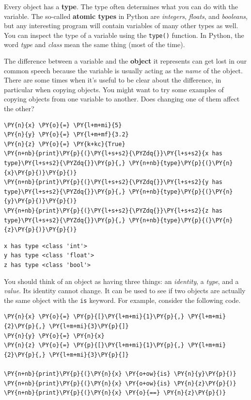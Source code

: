 Every object has a \textbf{type}.  The type often determines what you can do with the variable.  The so-called \textbf{atomic types} in Python are \emph{integers}, \emph{floats}, and \emph{booleans}, but any interesting program will contain variables of many other types as well.  You can inspect the type of a variable using the \texttt{type()} function.  In Python, the word \emph{type} and \emph{class} mean the same thing (most of the time).


The difference between a variable and the \textbf{object} it represents can get lost in our common speech because the variable is usually acting as the \emph{name} of the object.  There are some times when it's useful to be clear about the difference, in particular when copying objects.  You might want to try some examples of copying objects from one variable to another.  Does changing one of them affect the other?


\begin{Verbatim}[commandchars=\\\{\}]
\PY{n}{x} \PY{o}{=} \PY{l+m+mi}{5}
\PY{n}{y} \PY{o}{=} \PY{l+m+mf}{3.2}
\PY{n}{z} \PY{o}{=} \PY{k+kc}{True}
\PY{n+nb}{print}\PY{p}{(}\PY{l+s+s2}{\PYZdq{}}\PY{l+s+s2}{x has type}\PY{l+s+s2}{\PYZdq{}}\PY{p}{,} \PY{n+nb}{type}\PY{p}{(}\PY{n}{x}\PY{p}{)}\PY{p}{)}
\PY{n+nb}{print}\PY{p}{(}\PY{l+s+s2}{\PYZdq{}}\PY{l+s+s2}{y has type}\PY{l+s+s2}{\PYZdq{}}\PY{p}{,} \PY{n+nb}{type}\PY{p}{(}\PY{n}{y}\PY{p}{)}\PY{p}{)}
\PY{n+nb}{print}\PY{p}{(}\PY{l+s+s2}{\PYZdq{}}\PY{l+s+s2}{z has type}\PY{l+s+s2}{\PYZdq{}}\PY{p}{,} \PY{n+nb}{type}\PY{p}{(}\PY{n}{z}\PY{p}{)}\PY{p}{)}
\end{Verbatim}

\begin{Verbatim}
x has type <class 'int'>
y has type <class 'float'>
z has type <class 'bool'>
\end{Verbatim}


You should think of an object as having three things: an \emph{identity}, a \emph{type}, and a \emph{value}.
Its identity cannot change.  It can be used to see if two objects are actually the same object with the \texttt{is} keyword.
For example, consider the following code.


\begin{Verbatim}[commandchars=\\\{\}]
\PY{n}{x} \PY{o}{=} \PY{p}{[}\PY{l+m+mi}{1}\PY{p}{,} \PY{l+m+mi}{2}\PY{p}{,} \PY{l+m+mi}{3}\PY{p}{]}
\PY{n}{y} \PY{o}{=} \PY{n}{x}
\PY{n}{z} \PY{o}{=} \PY{p}{[}\PY{l+m+mi}{1}\PY{p}{,} \PY{l+m+mi}{2}\PY{p}{,} \PY{l+m+mi}{3}\PY{p}{]}

\PY{n+nb}{print}\PY{p}{(}\PY{n}{x} \PY{o+ow}{is} \PY{n}{y}\PY{p}{)}
\PY{n+nb}{print}\PY{p}{(}\PY{n}{x} \PY{o+ow}{is} \PY{n}{z}\PY{p}{)}
\PY{n+nb}{print}\PY{p}{(}\PY{n}{x} \PY{o}{==} \PY{n}{z}\PY{p}{)}
\end{Verbatim}

